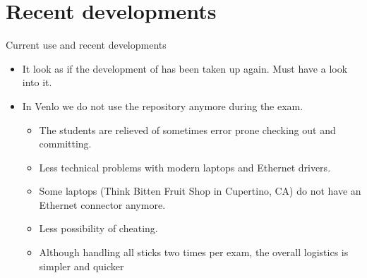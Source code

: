 \section{Recent developments}
\begin{frame}{Current use and recent developments}
  \begin{itemize}
  \item It look as if the development of  has been
    taken up again. Must have a look into it.
  \item In Venlo we do not use the repository anymore during the
    exam.
    \begin{itemize}
    \item The students are relieved of  sometimes error prone checking
      out and committing.
    \item Less technical problems with modern laptops and Ethernet drivers.
    \item Some laptops (Think Bitten Fruit Shop in Cupertino, CA) do not have an
      Ethernet connector anymore.
    \item Less possibility of cheating\InlineCinical.
    \item Although handling all sticks two times per exam, the overall
      logistics is simpler and quicker
    \end{itemize}
  \end{itemize}
\end{frame}
